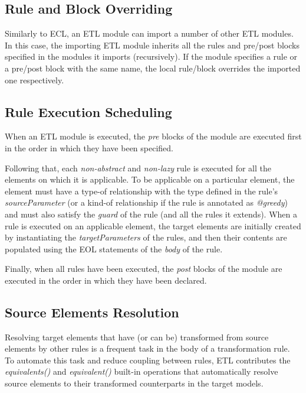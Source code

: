 \subsection{Rule and Block Overriding}
Similarly to ECL, an ETL module can import a number of other ETL modules. In this case, the importing ETL module inherits all the rules and pre/post blocks specified in the modules it imports (recursively). If the module specifies a rule or a pre/post block with the same name, the local rule/block overrides the imported one respectively.

\subsection{Rule Execution Scheduling}

When an ETL module is executed, the \emph{pre} blocks of the module are executed first in the order in which they have been specified. 

Following that, each \emph{non-abstract} and \emph{non-lazy} rule is executed for all the elements on which it is applicable. To be applicable on a particular element, the element must have a type-of relationship with the type defined in the rule's \emph{sourceParameter} (or a kind-of relationship if the rule is annotated as \emph{@greedy}) and must also satisfy the \emph{guard} of the rule (and all the rules it extends). When a rule is executed on an applicable element, the target elements are initially created by instantiating the \emph{targetParameters} of the rules, and then their contents are populated using the EOL statements of the \emph{body} of the rule.

Finally, when all rules have been executed, the \emph{post} blocks of the module are executed in the order in which they have been declared.

\subsection{Source Elements Resolution}

Resolving target elements that have (or can be) transformed from source elements by other rules is a frequent task in the body of a transformation rule. To automate this task and reduce coupling between rules, ETL contributes the \emph{equivalents()} and \emph{equivalent()} built-in operations that automatically resolve source elements to their transformed counterparts in the target models. 


